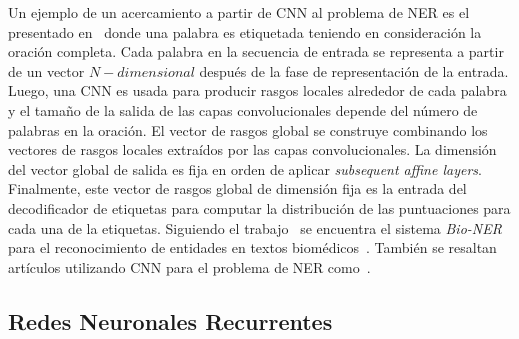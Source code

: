 Un ejemplo de un acercamiento a partir de CNN al problema de NER es el presentado en~\cite{collobert2011natural} donde una palabra es etiquetada teniendo en consideraci\'on la oraci\'on completa. Cada palabra en la secuencia de entrada se representa a partir de un vector $N-dimensional$ despu\'es de la fase de representaci\'on de la entrada. Luego, una CNN es usada para producir rasgos locales alrededor de cada palabra y el tama\~no de la salida de las capas convolucionales depende del n\'umero de palabras en la oraci\'on. El vector de rasgos global se construye combinando los vectores de rasgos locales extra\'idos por las capas convolucionales. La dimensi\'on del vector global de salida es fija en orden de aplicar \emph{subsequent affine layers}. Finalmente, este vector de rasgos global de dimensi\'on fija es la entrada del decodificador de etiquetas para computar la distribuci\'on de las puntuaciones para cada una de la etiquetas. Siguiendo el trabajo~\cite{collobert2011natural} se encuentra el sistema \emph{Bio-NER} para el reconocimiento de entidades en textos biom\'edicos~\cite{yao2015biomedical}. Tambi\'en se resaltan art\'iculos utilizando CNN para el problema de NER como~\cite{zhou2017joint}.

\subsection{Redes Neuronales Recurrentes}



